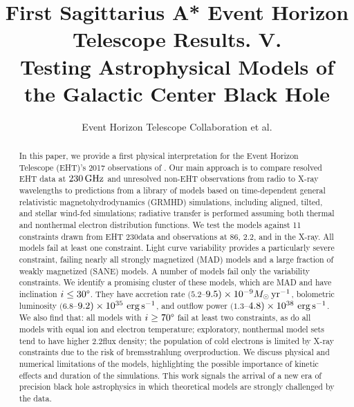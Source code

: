 \documentclass[twocolumn,twocolappendix,tighten,dvipsnames,linenumbers]{aastex63}
\begin{document}
\title{First Sagittarius A* Event Horizon Telescope Results. V.\\
  Testing Astrophysical Models of the Galactic Center Black Hole}

%
\author{Event Horizon Telescope Collaboration et al.}


\received{\today}
\revised{\today}

\begin{abstract}
  In this paper, we provide a first physical interpretation for the Event Horizon Telescope (EHT)'s 2017 observations of \sgra.
  Our main approach is to compare resolved EHT data at $230\,\mathrm{GHz}$ and unresolved non-EHT observations from radio to X-ray wavelengths to predictions from a library of models based on time-dependent general relativistic magnetohydrodynamics (GRMHD) simulations, including aligned, tilted, and stellar wind-fed simulations; radiative transfer is performed assuming both thermal and nonthermal electron distribution functions. We test the models against 11 constraints drawn from EHT 230\GHz data and observations at 86\GHz, 2.2\um, and in the X-ray.
  All models fail at least one constraint.
  Light curve variability provides a particularly severe constraint, failing nearly all strongly magnetized (MAD) models and a large fraction of weakly magnetized (SANE) models.
  A number of models fail only the variability constraints.  We identify a promising cluster of these models, which are MAD and have inclination $i \le 30\degree$.
  They  have accretion rate $(5.2$--$9.5)\times10^{-9}M_\odot\,\mathrm{yr}^{-1}$, bolometric luminosity $(6.8$--$9.2)\times10^{35}\,\,\mathrm{erg}\,\mathrm{s}^{-1}$, and outflow power $(1.3$--$4.8)\times10^{38}\,\,\mathrm{erg}\,\mathrm{s}^{-1}$.
  We also find that: all models with $i \ge 70\degree$ fail at least two constraints, as do all models with equal ion and electron temperature;  exploratory, nonthermal model sets tend to have higher 2.2\um flux density; the population of cold electrons is limited by X-ray constraints due to the risk of bremsstrahlung overproduction.
  We discuss physical and numerical limitations of the models, highlighting the possible importance of kinetic effects and duration of the simulations.
  This work signals the arrival of a new era of precision black hole astrophysics in which theoretical models are strongly challenged by the data.
\end{abstract}
\end{document}
